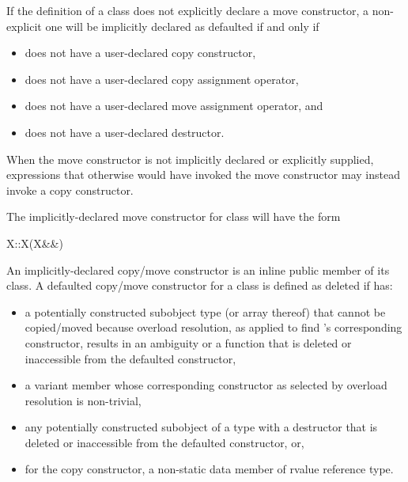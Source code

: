 \pnum
{}%
If the definition of a class  does not explicitly declare
a move constructor, a non-explicit one will be
implicitly declared as defaulted if and only if
\begin{itemize}
\item
{} does not have a user-declared copy constructor,

\item
{} does not have a user-declared copy assignment operator,

\item
{} does not have a user-declared move assignment operator, and

\item
{} does not have a user-declared destructor.
\end{itemize}

\begin{note}
When the move constructor is not implicitly declared or explicitly supplied,
expressions that otherwise would have invoked the move constructor may instead invoke
a copy constructor.
\end{note}

\pnum
The implicitly-declared move constructor for class  will have the form
\begin{codeblock}
X::X(X&&)
\end{codeblock}

\pnum
An implicitly-declared copy/move constructor is an
inline public member of its class.
A defaulted copy/\brk{}move constructor for a class
   is defined as deleted if  has:
\begin{itemize}
\item a potentially constructed subobject type
   (or array thereof) that cannot be copied/moved because
  overload resolution, as applied to find
  's
  corresponding constructor, results in an ambiguity or
  a function that is deleted or inaccessible from the
  defaulted constructor,

\item a variant member whose corresponding constructor
  as selected by overload resolution is non-trivial,

\item any potentially constructed subobject of a type
  with a destructor that is deleted or inaccessible from the defaulted
  constructor, or,

\item for the copy constructor, a non-static data member of rvalue reference type.
\end{itemize}

